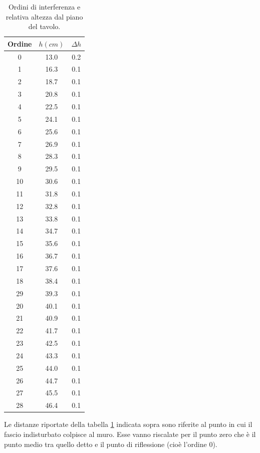 \documentclass[10pt,a4paper]{article}
\begin{document}
\begin{table}[!htb]
\centering
\begin{tabular}{|c|c|c|}
\hline
Ordine & $h (cm)$ & $ \Delta h$ \\
\hline
0	&	13.0	&	0.2\\
1	&	16.3	&	0.1\\
2	&	18.7	&	0.1\\
3	&	20.8	&	0.1\\
4	&	22.5	&	0.1\\
5	&	24.1	&	0.1\\
6	&	25.6	&	0.1\\
7	&	26.9	&	0.1\\
8	&	28.3	&	0.1\\
9	&	29.5	&	0.1\\
10	&	30.6	&	0.1\\
11	&	31.8	&	0.1\\
12	&	32.8	&	0.1\\
13	&	33.8	&	0.1\\
14	&	34.7	&	0.1\\
15	&	35.6	&	0.1\\
16	&	36.7	&	0.1\\
17	&	37.6	&	0.1\\
18	&	38.4	&	0.1\\
29	&	39.3	&	0.1\\
20	&	40.1	&	0.1\\
21	&	40.9	&	0.1\\
22	&	41.7	&	0.1\\
23	&	42.5	&	0.1\\
24	&	43.3	&	0.1\\
25	&	44.0	&	0.1\\
26	&	44.7	&	0.1\\
27	&	45.5	&	0.1\\
28	&	46.4	&	0.1\\
\hline
\end{tabular}
\caption{Ordini di interferenza e relativa altezza dal piano del tavolo.}
\label{Ordini}
\end{table}

Le distanze riportate della tabella \ref{Ordini} indicata sopra sono riferite al punto in cui il fascio indisturbato colpisce al muro. Esse vanno riscalate per il punto zero che è il punto medio tra quello detto e il punto di riflessione (cioè l'ordine 0).\\
\end{document}
